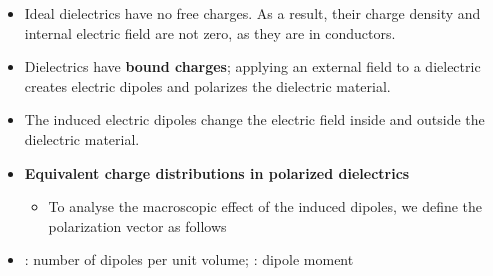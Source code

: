 \ELhold


\begin{ELunit}

\begin{itemize}
\tightlist
\item
  Ideal dielectrics have no free charges. As a result, their charge density and internal electric field are not zero, as they are in conductors.
\item
  Dielectrics have \textbf{bound charges}; applying an external field to a dielectric creates electric dipoles and polarizes the dielectric material.
\item
  The induced electric dipoles change the electric field inside and outside the dielectric material.
\end{itemize}


\end{ELunit}

\begin{ELjoin}

\begin{itemize}
\tightlist
\item
  \textbf{Equivalent charge distributions in polarized dielectrics}

  \begin{itemize}
  \tightlist
  \item
    To analyse the macroscopic effect of the induced dipoles, we define the polarization vector  as follows
  \end{itemize}
\end{itemize}

\begin{ELdefinition}{}


\begin{itemize}
\tightlist
\item
  : number of dipoles per unit volume; : dipole moment
\end{itemize}

\end{ELdefinition}

\end{ELjoin}

